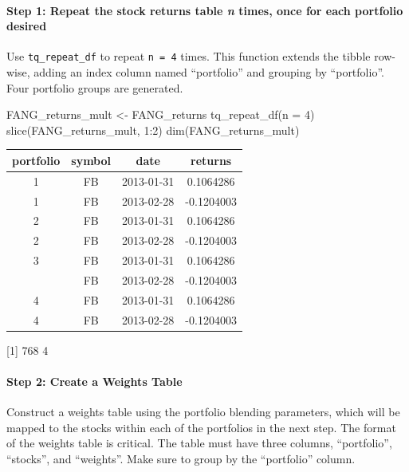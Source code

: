 \paragraph{\texorpdfstring{Step 1: Repeat the stock returns table
\emph{n} times, once for each portfolio
desired}{Step 1: Repeat the stock returns table n times, once for each portfolio desired}}\label{step-1-repeat-the-stock-returns-table-n-times-once-for-each-portfolio-desired}

Use \texttt{tq\_repeat\_df} to repeat \texttt{n\ =\ 4} times. This
function extends the tibble row-wise, adding an index column named
``portfolio'' and grouping by ``portfolio''. Four portfolio groups are
generated.

\begin{Schunk}
\begin{Sinput}
FANG_returns_mult <- FANG_returns %
    tq_repeat_df(n = 4)
slice(FANG_returns_mult, 1:2)
dim(FANG_returns_mult)
\end{Sinput}
\end{Schunk}

\begin{tabular}{cccc}
\toprule
portfolio & symbol & date & returns\\
\midrule
1 & FB & 2013-01-31 & 0.1064286\\
1 & FB & 2013-02-28 & -0.1204003\\
2 & FB & 2013-01-31 & 0.1064286\\
2 & FB & 2013-02-28 & -0.1204003\\
3 & FB & 2013-01-31 & 0.1064286\\
\addlinespace
3 & FB & 2013-02-28 & -0.1204003\\
4 & FB & 2013-01-31 & 0.1064286\\
4 & FB & 2013-02-28 & -0.1204003\\
\bottomrule
\end{tabular}

{[}1{]} 768 4

\hspace{20 mm}

\paragraph{Step 2: Create a Weights
Table}\label{step-2-create-a-weights-table}

Construct a weights table using the portfolio blending parameters, which
will be mapped to the stocks within each of the portfolios in the next
step. The format of the weights table is critical. The table must have
three columns, ``portfolio'', ``stocks'', and ``weights''. Make sure to
group by the ``portfolio'' column.

